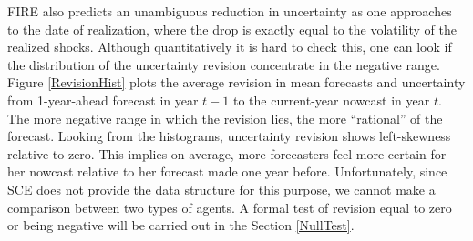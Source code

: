 \documentclass[]{article}
\begin{document}
	FIRE also predicts an unambiguous reduction in uncertainty as one approaches to the date of realization, where the drop is exactly equal to the volatility of the realized shocks. Although quantitatively it is hard to check this, one can look if the distribution of the uncertainty revision concentrate in the negative range. Figure \ref{RevisionHist} plots the average revision in mean forecasts and uncertainty from 1-year-ahead forecast in year $t-1$ to the current-year nowcast in year $t$. The more negative range in which the revision lies, the more ``rational'' of the forecast. Looking from the histograms, uncertainty revision shows left-skewness relative to zero. This implies on average,  more forecasters feel more certain for her nowcast relative to her forecast made one year before.  Unfortunately, since SCE does not provide the data structure for this purpose, we cannot make a comparison between two types of agents. A formal test of revision equal to zero or being negative will be carried out in the Section \ref{NullTest}. 
	
\end{document}
